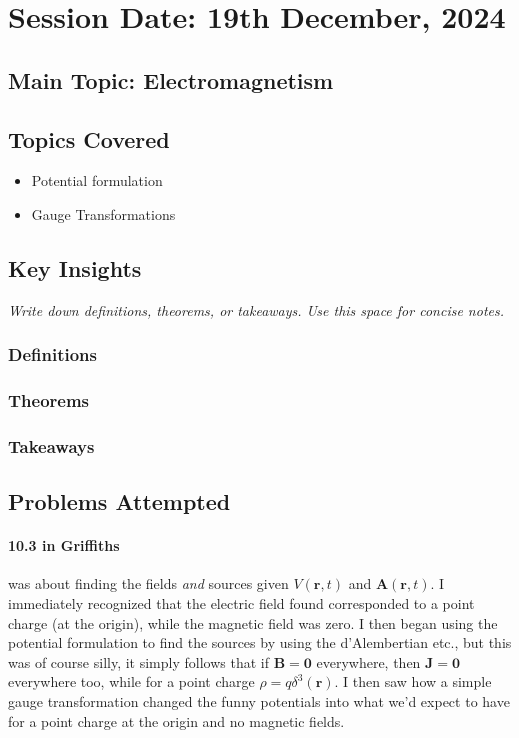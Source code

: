 \section{Session Date: 19th December, 2024}
\subsection*{Main Topic: Electromagnetism}
\subsection*{Topics Covered}
\begin{itemize}
    \item Potential formulation
    \item Gauge Transformations
\end{itemize}

\subsection*{Key Insights}
\textit{Write down definitions, theorems, or takeaways. Use this space for concise notes.}
\subsubsection*{Definitions} 
\subsubsection*{Theorems}
\subsubsection*{Takeaways}

\subsection*{Problems Attempted}
\paragraph{10.3 in Griffiths} was about finding the fields \textit{and} sources given \(V(\mathbf{r}, t)\) and \(\mathbf{A}(\mathbf{r}, t)\). I immediately recognized that the electric field found corresponded to a point charge (at the origin), while the magnetic field was zero. I then began using the potential formulation to find the sources by using the d'Alembertian etc., but this was of course silly, it simply follows that if \(\mathbf{B} = \mathbf{0}\) everywhere, then \(\mathbf{J} = \mathbf{0}\) everywhere too, while for a point charge \(\rho = q \delta ^3 (\mathbf{r})\). I then saw how a simple gauge transformation changed the funny potentials into what we'd expect to have for a point charge at the origin and no magnetic fields.

